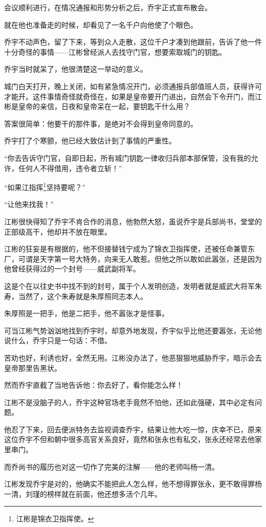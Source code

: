 \begin{multicols}{\theparacolNo}
		会议顺利进行，在情况通报和形势分析之后，乔宇正式宣布散会。

		就在他也准备走的时候，却看见了一名千户向他使了个眼色。

		乔宇不动声色，留了下来，等到众人走散，这位千户才凑到他跟前，告诉了他一件十分奇怪的事情——江彬曾经派人去找守门官，想要索取城门的钥匙。

		乔宇当时就呆了，他很清楚这一举动的意义。

		城门白天打开，晚上关闭，如有紧急情况开门，必须通报兵部值班人员，获得许可才能开。这件事情奇怪就奇怪在，如果是皇帝要开门进出，自然会下令开门，而江彬是皇帝的亲信，日夜和皇帝呆在一起，要钥匙干什么用？

		答案很简单：他要干的那件事，是绝对不会得到皇帝同意的。

		乔宇打了个寒颤，他已经大致估计到了事情的严重性。

		“你去告诉守门官，自即日起，所有城门钥匙一律收归兵部本部保管，没有我的允许，任何人不得借用，违令者立斩！”

		“如果江指挥\footnote{江彬是锦衣卫指挥使。}坚持要呢？”

		“让他来找我！”

		江彬很快得知了乔宇不肯合作的消息，他勃然大怒，虽说乔宇是兵部尚书，堂堂的正部级高干，他却并不放在眼里。

		江彬的狂妄是有根据的，他不但接替钱宁成为了锦衣卫指挥使，还被任命兼管东厂，可谓是天字第一号大特务，向来无人敢惹。但他之所以敢如此嚣张，还是因为他曾经获得过的一个封号——威武副将军。

		这是个在以往史书中找不到的封号，属于个人发明创造，发明者就是威武大将军朱寿，当然了，这个朱寿就是朱厚照同志本人。

		朱厚照是一把手，他是二把手，他不嚣张才是怪事。

		可当江彬气势汹汹地找到乔宇时，却意外地发现，乔宇似乎比他还要嚣张，无论他说什么，乔宇只是一句话：不借。

		苦劝也好，利诱也好，全然无用。江彬没办法了，他恶狠狠地威胁乔宇，暗示会去皇帝那里告黑状。

		然而乔宇直截了当地告诉他：你去好了，看你能怎么样！

		江彬不是没脑子的人，乔宇这种官场老手竟然不怕他，还如此强硬，其中必定有问题。

		他忍了下来，回去便派特务去监视调查乔宇，结果让他大吃一惊，庆幸不已，原来这位乔宇不但和朝中很多高官关系良好，竟然和张永也有私交，张永还经常去他家里串门。

		而乔尚书的履历也对这一切作了完美的注解——他的老师叫杨一清。

		江彬发现乔宇是对的，他确实不能把此人怎么样，他不想得罪张永，更不敢得罪杨一清，刘瑾的榜样就在前面，他还想多活个几年。


\end{multicols}
